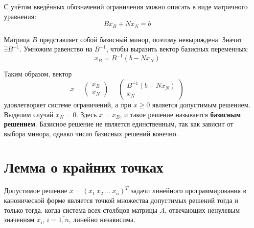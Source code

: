 \documentclass[17pt]{extarticle}
\begin{document}
С учётом введённых обозначений ограничения можно описать в виде матричного уравнения:
\[
    B x_B + N x_N = b
\]

Матрица \( B \) представляет собой базисный минор, поэтому невырождена. Значит \( \exists B^{-1} \). Умножим равенство на \( B^{-1} \), чтобы выразить вектор базисных переменных:
\[
    x_B = B^{-1}(b - N x_N)
\]

Таким образом, вектор
\[
    x = \begin{pmatrix}
        x_B \\ x_N
    \end{pmatrix}
    = \begin{pmatrix}
        B^{-1}(b - N x_N) \\ x_N
    \end{pmatrix}
\]
удовлетворяет системе ограничений, а при \( x \ge 0 \) является допустимым решением. Выделим случай \( x_N = 0 \). Здесь \( x = x_B \), и такое решение называется \textbf{базисным решением}. Базисное решение не является единственным, так как зависит от выбора минора, однако число базисных решений конечно.




\section{Лемма о крайних точках}

\begin{lemma}
    Допустимое решение \( x = (x_1 \ x_2 \ \dots \ x_n)^T \) задачи линейного программирования в канонической форме
    является точкой множества допустимых решений тогда и только тогда, когда система всех столбцов матрицы \( A \),
    отвечающих ненулевым значениям \( x_i \), \( i = \overline{1,n} \), линейно независима.
\end{lemma}
\end{document}
